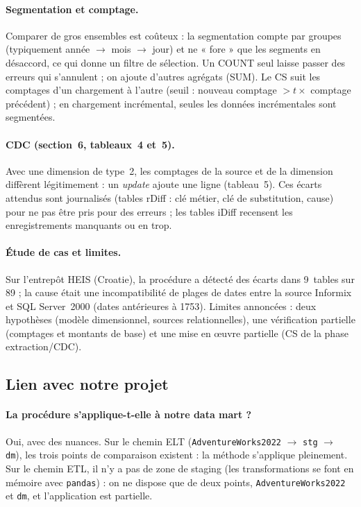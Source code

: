\documentclass[9pt,a4paper]{article}
\begin{document}
\paragraph{Segmentation et comptage.} Comparer de gros ensembles est coûteux : la segmentation compte par groupes (typiquement année $\rightarrow$ mois $\rightarrow$ jour) et ne « fore » que les segments en désaccord, ce qui donne un filtre de sélection. Un COUNT seul laisse passer des erreurs qui s'annulent ; on ajoute d'autres agrégats (SUM). Le CS suit les comptages d'un chargement à l'autre (seuil : nouveau comptage $>t\times$ comptage précédent) ; en chargement incrémental, seules les données incrémentales sont segmentées.

\paragraph{CDC (section~6, tableaux~4 et~5).} Avec une dimension de type~2, les comptages de la source et de la dimension diffèrent légitimement : un \emph{update} ajoute une ligne (tableau~5). Ces écarts attendus sont journalisés (tables rDiff : clé métier, clé de substitution, cause) pour ne pas être pris pour des erreurs ; les tables iDiff recensent les enregistrements manquants ou en trop.

\paragraph{Étude de cas et limites.} Sur l'entrepôt HEIS (Croatie), la procédure a détecté des écarts dans 9~tables sur 89 ; la cause était une incompatibilité de plages de dates entre la source Informix et SQL Server~2000 (dates antérieures à 1753). Limites annoncées : deux hypothèses (modèle dimensionnel, sources relationnelles), une vérification partielle (comptages et montants de base) et une mise en œuvre partielle (CS de la phase extraction/CDC).

\subsection{Lien avec notre projet}

\paragraph{La procédure s'applique-t-elle à notre data mart ?} Oui, avec des nuances. Sur le chemin ELT (\texttt{AdventureWorks2022} $\rightarrow$ \texttt{stg} $\rightarrow$ \texttt{dm}), les trois points de comparaison existent : la méthode s'applique pleinement. Sur le chemin ETL, il n'y a pas de zone de staging (les transformations se font en mémoire avec \texttt{pandas}) : on ne dispose que de deux points, \texttt{AdventureWorks2022} et \texttt{dm}, et l'application est partielle.
\end{document}
